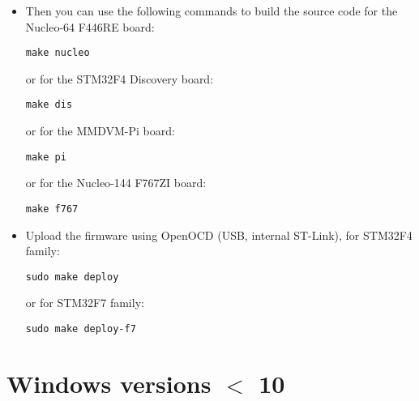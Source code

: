 \documentclass[]{article}
\begin{document}
\begin{itemize}[leftmargin=*]
\item Then you can use the following commands to build the source code for the Nucleo-64 F446RE board:
\begin{lstlisting}[style=DOS]
make nucleo
\end{lstlisting}
	
or for the STM32F4 Discovery board:
\begin{lstlisting}[style=DOS]
make dis
\end{lstlisting}
	
or for the MMDVM-Pi board:
\begin{lstlisting}[style=DOS]
make pi
\end{lstlisting}
	
or for the Nucleo-144 F767ZI board:
\begin{lstlisting}[style=DOS]
make f767
\end{lstlisting}
	
\item Upload the firmware using OpenOCD (USB, internal ST-Link), for STM32F4 family:
\begin{lstlisting}[style=DOS]
sudo make deploy
\end{lstlisting}
	
or for STM32F7 family:
\begin{lstlisting}[style=DOS]
sudo make deploy-f7
\end{lstlisting}
	
\end{itemize}

\section{Windows versions $<$ 10}
\end{document}
